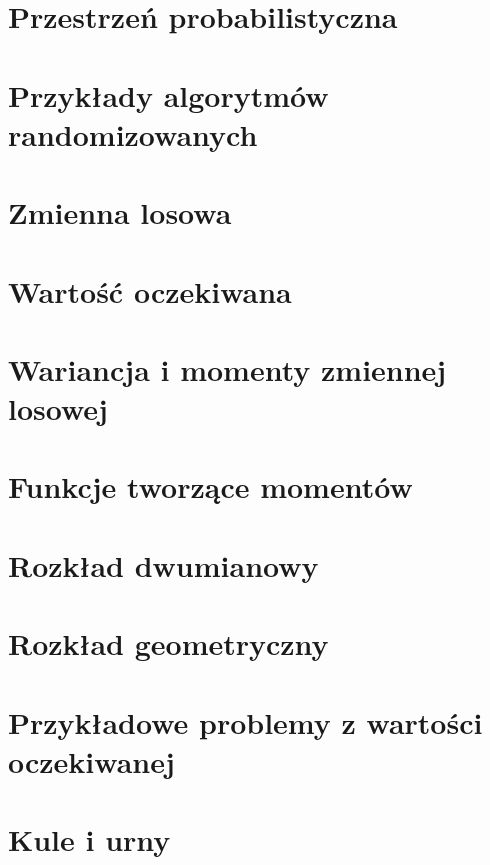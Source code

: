 \section{Przestrzeń probabilistyczna}


\newpage
\section{Przykłady algorytmów randomizowanych}


\newpage
\section{Zmienna losowa}


\newpage
\section{Wartość oczekiwana}


\newpage
\section{Wariancja i momenty zmiennej losowej}


\newpage
\section{Funkcje tworzące momentów}


\newpage
\section{Rozkład dwumianowy}


\newpage
\section{Rozkład geometryczny}


\newpage
\section{Przykładowe problemy z wartości oczekiwanej}


\newpage
\section{Kule i urny}

